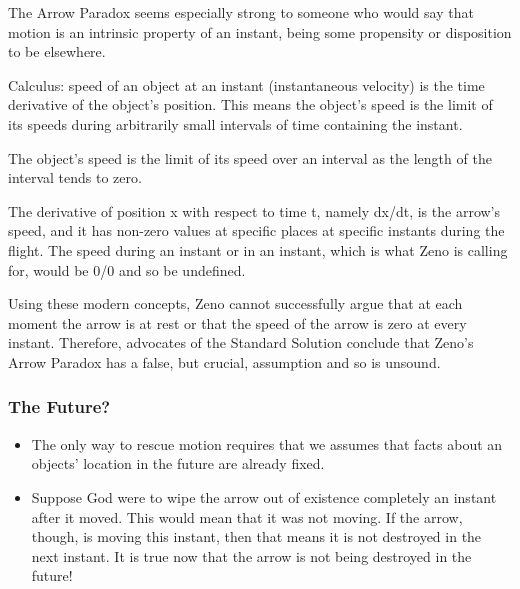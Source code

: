 \documentclass[]{article}
\begin{document}
The Arrow Paradox seems especially strong to someone who would say that
motion is an intrinsic property of an instant, being some propensity or
disposition to be elsewhere.

Calculus: speed of an object at an instant (instantaneous velocity) is
the time derivative of the object's position. This means the object's speed is the limit of its speeds during
arbitrarily small intervals of time containing the instant.

The object's speed is the limit of its speed over an interval as the
length of the interval tends to zero.

The derivative of position x with respect to time t, namely dx/dt, is
the arrow's speed, and it has non-zero values at specific places at
specific instants during the flight. The speed during an instant or in an instant, which is what Zeno is
calling for, would be 0/0 and so be undefined.

Using these modern concepts, Zeno cannot successfully argue that at each
moment the arrow is at rest or that the speed of the arrow is zero at
every instant. Therefore, advocates of the Standard Solution conclude
that Zeno's Arrow Paradox has a false, but crucial, assumption and so is
unsound.

\subsubsection{The Future?}\label{the-future}

\begin{itemize}
\item
  The only way to rescue motion requires that we assumes that facts
  about an objects' location in the future are already fixed.
\item
  Suppose God were to wipe the arrow out of existence completely an
  instant after it moved. This would mean that it was not moving. If the
  arrow, though, is moving this instant, then that means it is not
  destroyed in the next instant. It is true now that the arrow is not
  being destroyed in the future!
\end{itemize}
\end{document}
